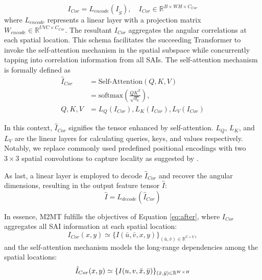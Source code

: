 \begin{equation}
I_{Cor} = L_{encode}(I_{\tilde{S}}), \quad I_{Cor} \in \mathbb{R}^{B \times WH \times C_{Cor}}
\end{equation}
where $L_{encode}$ represents a linear layer with a projection matrix $W_{encode} \in \mathbb{R}^{UVC \times C_{Cor}}$. The resultant $I_{Cor}$ aggregates the angular correlations at each spatial location. This schema facilitates the succeeding Transformer to invoke the self-attention mechanism in the spatial subspace while concurrently tapping into correlation information from all SAIs. The self-attention mechanism is formally defined as
\begin{equation}
    \begin{aligned}
        \label{eq:self-attention}
        \hat{I}_{Cor} & = \text{Self-Attention}(Q, K, V) \\
                     & = \text{softmax}\left(\frac{QK^T}{\sqrt{d_k}}\right), \\
               Q,K,V & = L_Q({I_{Cor}}),L_K({I_{Cor}}),L_V({I_{Cor}})
    \end{aligned}
\end{equation}

In this context, $\hat{I}_{Cor}$ signifies the tensor enhanced by self-attention. $L_Q$, $L_K$, and $L_V$ are the linear layers for calculating queries, keys, and values respectively. Notably, we replace commonly used predefined positional encodings with two $3 \times 3$ spatial convolutions to capture locality as suggested by \cite{chuCPVT_arxiv2021}.

As last, a linear layer is employed to decode $\hat{I}_{Cor}$ and recover the angular dimensions, resulting in the output feature tensor $\hat{I}$:
\begin{equation}
    \hat{I} = L_{decode}(\hat{I}_{Cor})
\end{equation}

In essence, M2MT fulfills the objectives of Equation \ref{eq:after}, where $I_{Cor}$ aggregates all SAI information at each spatial location:
\begin{equation}
    I_{Cor}(x, y) \simeq \{I(\bar{u}, \bar{v}, x, y)\}_{(\bar{u}, \bar{v}) \in \mathbb{R}^{U \times V}},
\end{equation}
and the self-attention mechanism models the long-range dependencies among the spatial locations:
\begin{equation}
    \hat{I}_{Cor}(x, y) \simeq \{I(u, v, \bar{x}, \bar{y})\}_{(\bar{x}, \bar{y}) \in \mathbb{R}^{W \times H}} \\
\end{equation}

